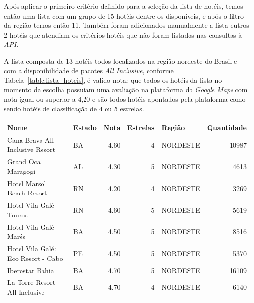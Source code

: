 Após aplicar o primeiro critério definido para a seleção da lista de hotéis, temos então uma lista com um grupo de 15 hotéis dentre os disponíveis, e após o filtro da região temos então 11. Também foram adicionados manualmente a lista outros 2 hotéis que atendiam os critérios hotéis que não foram listados nas consultas à \textit{API}.

A lista composta de 13 hotéis todos localizados na região nordeste do Brasil e com a disponibilidade de pacotes \textit{All Inclusive}, conforme Tabela~\ref{table:lista_hoteis}, é valido notar que todos os hotéis da lista no momento da escolha possuíam uma avaliação na plataforma do \textit{Google Maps} com nota igual ou superior a 4,20 e são todos hotéis apontados pela plataforma como sendo hotéis de classificação de 4 ou 5 estrelas.

\begin{table}[]
	\begin{tabular}{|p{5cm}|l|r|r|l|r|}
		\hline
		\textbf{Nome}                                 & \textbf{Estado} & \textbf{Nota} & \textbf{Estrelas} & \textbf{Região} & \textbf{Quantidade} \\\hline
		Cana Brava All Inclusive Resort               & BA              & 4.60          & 4                 & NORDESTE        & 10987               \\\hline
		Grand Oca Maragogi                            & AL              & 4.30          & 5                 & NORDESTE        & 4613                \\\hline
		Hotel Marsol Beach Resort                     & RN              & 4.20          & 4                 & NORDESTE        & 3269                \\\hline
		Hotel Vila Galé - Touros                      & RN              & 4.60          & 5                 & NORDESTE        & 5619                \\\hline
		Hotel Vila Galé - Marés                       & BA              & 4.50          & 5                 & NORDESTE        & 8516                \\\hline
		Hotel Vila Galé: Eco Resort - Cabo            & PE              & 4.50          & 5                 & NORDESTE        & 5370                \\\hline
		Iberostar Bahia                               & BA              & 4.70          & 5                 & NORDESTE        & 16109               \\\hline
		La Torre Resort All Inclusive                 & BA              & 4.70          & 4                 & NORDESTE        & 6140                \\\hline

\end{tabular}
\end{table}
